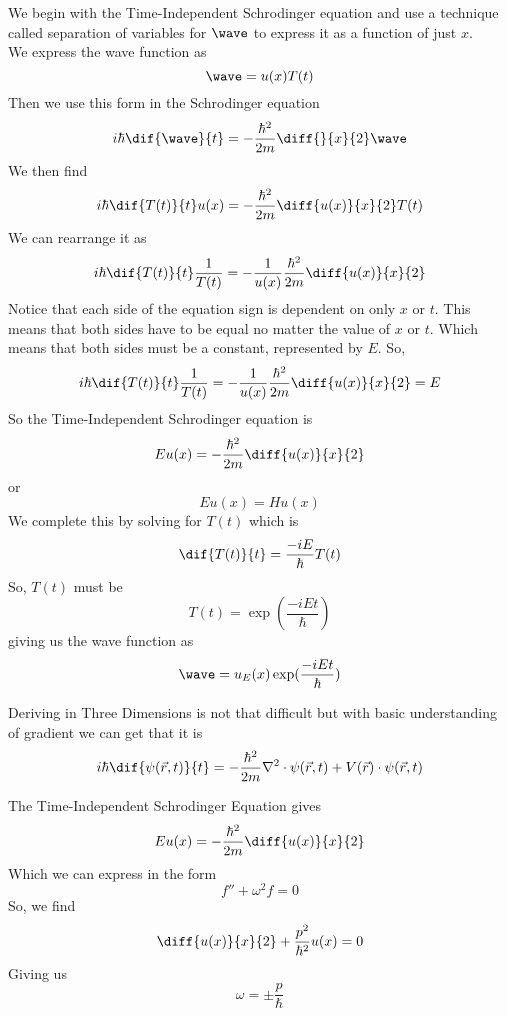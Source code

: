 \begin{ans}
	We begin with the Time-Independent Schrodinger equation and use a technique called separation of variables for $ \wave $ to express it as a function of just $ x $. \\
	We express the wave function as
	\[ \wave = u(x)T(t) \]
	Then we use this form in the Schrodinger equation
	\[ i\hbar \dif{\wave}{t} = -\frac{\hbar^2}{2m} \diff{}{x}{2} \wave \]
	We then find
	\[ i\hbar \dif{T(t)}{t} u(x) = -\frac{\hbar^2}{2m} \diff{u(x)}{x}{2} T(t)\]
	We can rearrange it as
	\[ i\hbar \dif{T(t)}{t} \frac{1}{T(t)} = -\frac{1}{u(x)}\frac{\hbar^2}{2m} \diff{u(x)}{x}{2} \]
	Notice that each side of the equation sign is dependent on only $ x $ or $ t $. This means that both sides have to be equal no matter the value of $ x $ or $ t $. Which means that both sides must be a constant, represented by $ E $. So, 
	\[ i\hbar \dif{T(t)}{t} \frac{1}{T(t)} = -\frac{1}{u(x)}\frac{\hbar^2}{2m} \diff{u(x)}{x}{2} = E\]
	So the Time-Independent Schrodinger equation is 
	\[ Eu(x) =  -\frac{\hbar^2}{2m} \diff{u(x)}{x}{2}\]
	or
	\[ Eu(x) = Hu(x) \]
	We complete this by solving for $ T(t) $ which is 
	\[ \dif{T(t)}{t} = \frac{-i E}{\hbar} T(t) \]
	So, $ T(t) $ must be
	\[ T(t) = \exp(\frac{-iEt}{\hbar}) \]
	giving us the wave function as
	\[ \wave = u_E(x) \exp(\frac{-iEt}{\hbar}) \]
\end{ans}
\begin{ans}
	Deriving in Three Dimensions is not that difficult but with basic understanding of gradient we can get that it is 
	\[ i \hbar \dif{\psi(\vec{r}, t)}{t} = -\frac{\hbar^2}{2m} \nabla^2 \cdot \psi(\vec{r}, t) + V(\vec{r}) \cdot \psi(\vec{r}, t) \]
\end{ans}
\begin{ans}
	The Time-Independent Schrodinger Equation gives 
	\[ Eu(x) = -\frac{\hbar^2}{2m} \diff{u(x)}{x}{2}\]
	Which we can express in the form
	\[ f'' + \omega^2 f = 0 \]
	So, we find
	\[ \diff{u(x)}{x}{2} + \frac{p^2}{\hbar^2} u(x) = 0  \]
	Giving us
	\[ \omega = \pm \frac{p}{\hbar} \]
\end{ans}